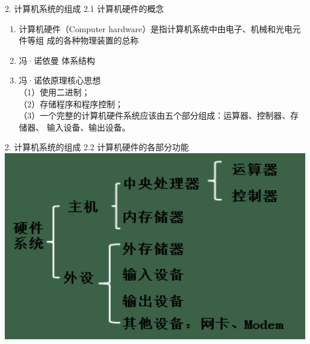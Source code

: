 \documentclass[aspectratio=169]{beamer}
\begin{document}
\begin{frame}[t]{2. 计算机系统的组成} \vspace{20pt}
    2.1 计算机硬件的概念

    \begin{enumerate}
        \item{计算机硬件（Computer hardware）是指计算机系统中由电子、机械和光电元件等组
            成的各种物理装置的总称}\\
        \item {冯·诺依曼 体系结构}\\
        \item {冯·诺依原理核心思想}\\
            （1）使用二进制；\\
            （2）存储程序和程序控制；\\
            （3）一个完整的计算机硬件系统应该由五个部分组成：运算器、控制器、存储器、
            输入设备、输出设备。\\
    \end{enumerate}

\end{frame}


\begin{frame}[t]{2. 计算机系统的组成} \vspace{20pt}
    2.2 计算机硬件的各部分功能\\
    \includegraphics[scale=0.25]{hardware_function}\\ 
\end{frame}
\end{document}
